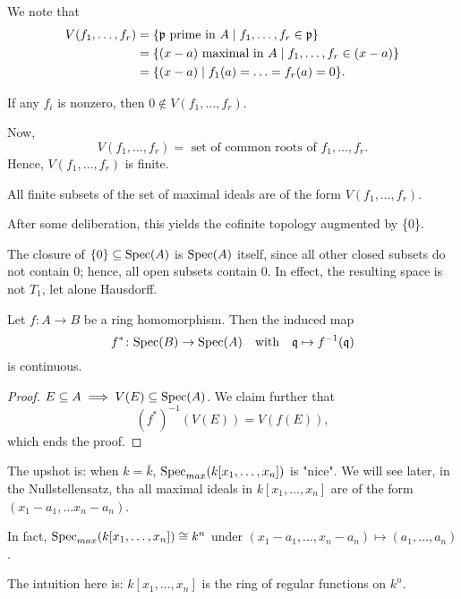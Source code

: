 We note that
\begin{align*}
  V(f_1, \ldots, f_r) & = \{ \mathfrak p \text{ prime in } A \mathrel{|} f_1, \dotsc, f_r \in \mathfrak p\} \\
                      & = \{(x-a) \text{ maximal in } A \mathrel{|} f_1, \dotsc, f_r \in (x-a)\} \\
                      & = \{ (x-a) \mathrel{|} f_1(a) = \dotsc = f_r(a) = 0 \}.
\end{align*}

If any $f_i$ is nonzero, then $0 \notin V(f_1, \dotsc, f_r)$.

Now,
\[ V(f_1, \ldots, f_r) = \text{ set of common roots of }f_1, \ldots, f_r .\]
Hence, $V(f_1, \ldots, f_r)$ is finite.

\begin{note}
All finite subsets of the set of maximal ideals are of the form $V(f_1, \ldots, f_r)$.

After some deliberation, this yields the cofinite topology augmented by \{0\}.
\end{note}

\begin{note}
  The closure of $\{0\} \subseteq \text{Spec}(A)$ is $\text{Spec}(A)$ itself, since all other closed subsets do not contain 0; hence, all open subsets contain 0.
In effect, the resulting space is not $T_1$, let alone Hausdorff.
\end{note}

\begin{prop}
  Let $f \colon A \to B$ be a ring homomorphism. Then the induced map
  \[f^* \colon \text{Spec}(B) \to \text{Spec}(A)
    \quad \text{with} \quad
    \mathfrak q \mapsto f^{-1}(\mathfrak q)\]
  is continuous.
\end{prop}
\begin{proof}
$E \subseteq A \implies V(E) \subseteq \text{Spec}(A)$.
We claim further that
\[ (f^*)^{-1}(V(E)) = V(f(E)), \]
which ends the proof.
\end{proof}

The upshot is: when $k = \bar k$, $\text{Spec}_{max}(k[x_1, \ldots, x_n])$ is "nice". We will see later, in the Nullstellensatz, tha all maximal ideals in $k[x_1, \ldots, x_n]$ are of the form $(x_1 - a_1, \ldots x_n - a_n)$.

In fact,
$\text{Spec}_{max}(k[x_1, \ldots, x_n]) \cong k^n$
under
$(x_1 - a_1, \ldots, x_n - a_n) \mapsto (a_1, \ldots, a_n)$.

The intuition here is: $k[x_1, \ldots, x_n]$ is the ring of regular functions on $k^n$.

